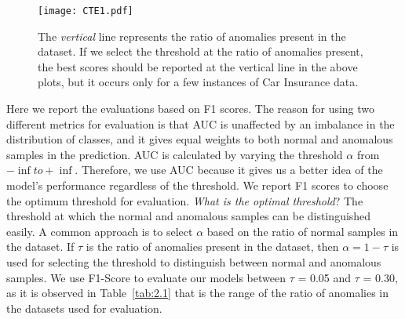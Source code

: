 \documentclass{article}
\begin{document}
\begin{figure}[htbp]
    \centering
    \texttt{[image: CTE1.pdf]}
    \caption{The \textit{vertical} line represents the ratio of anomalies present in the dataset. If we select the threshold at the ratio of anomalies present, the best scores should be reported at the vertical line in the above plots, but it occurs only for a few instances of Car Insurance data.}
    \label{fig:cte}
\end{figure}

Here we report the evaluations based on F1 scores. The reason for using two different metrics for evaluation is that AUC is unaffected by an imbalance in the distribution of classes, and it gives equal weights to both normal and anomalous samples in the prediction. AUC is calculated by varying the threshold $\alpha$ from $-\inf to +\inf$. Therefore, we use AUC because it gives us a better idea of the model's performance regardless of the threshold. We report F1 scores to choose the optimum threshold for evaluation. \textit{What is the optimal threshold}? The threshold at which the normal and anomalous samples can be distinguished easily. A common approach is to select $\alpha$ based on the ratio of normal samples in the dataset. If $\tau$ is the ratio of anomalies present in the dataset, then $\alpha = 1 - \tau$ is used for selecting the threshold to distinguish between normal and anomalous samples. We use F1-Score to evaluate our models between $\tau$ = 0.05 and $\tau$ = 0.30, as it is observed in Table~\ref{tab:2.1} that is the range of the ratio of anomalies in the datasets used for evaluation.
\end{document}
